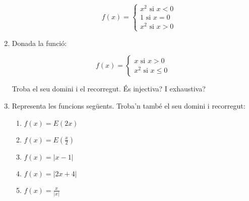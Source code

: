 \documentclass{article}
\begin{document}
\begin{enumerate}
\begin{enumerate}
	$$
	f(x)=
	\begin{cases}
	x^2 \mbox{ si } x < 0 \\
	1 \mbox{ si } x=0 \\
    x^2 \mbox{ si } x > 0
	\end{cases}
	$$
	
\end{enumerate}

\item Donada la funció:

$$
f(x)=
\begin{cases}
x \mbox{ si } x > 0 \\
x^2 \mbox{ si } x \le 0

\end{cases}
$$

Troba el seu domini i el recorregut. És injectiva? I exhaustiva?
 
\item Representa les funcions següents. Troba'n també el seu domini i recorregut:

\begin{enumerate}
 
\item $f(x)=E(2x)$
\item $f(x)=E(\frac{x}{2})$
\item $f(x)=|x-1|$
\item $f(x)=|2x+4|$
\item $f(x)=\frac{x}{|x|}$

\end{enumerate}

\end{enumerate}
 
\end{document}
